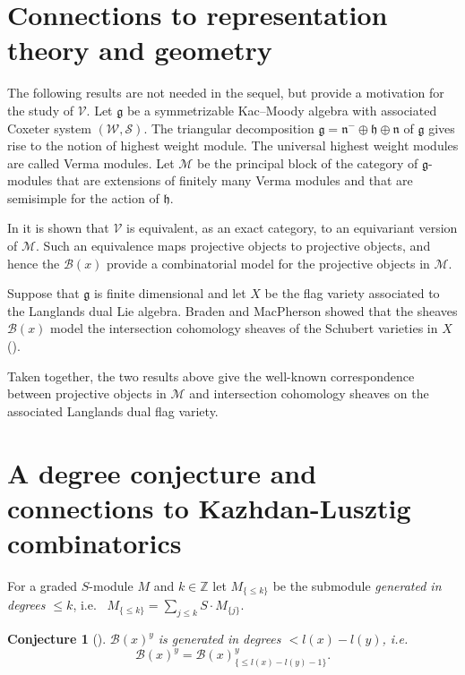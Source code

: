 \documentclass[12pt]{amsart}
\newtheorem{conjecture}[theorem]{Conjecture}
\theoremstyle{definition}
\theoremstyle{remark}
\def\varle{\leqslant}
\newcommand{\CM}{{\mathcal M}}
\newcommand{\CS}{{\mathcal S}}
\newcommand{\CV}{{\mathcal V}}
\newcommand{\CW}{{\mathcal W}}
\newcommand{\fh}{{{\mathfrak h}}}
\newcommand{\fg}{{{\mathfrak g}}}
\newcommand{\fn}{{{\mathfrak n}}}
\newcommand{\SB}{{\mathscr B}}
\newcommand{\DZ}{{\mathbb Z}}
\begin{document}
\section{Connections to representation theory and geometry}
The following results are not needed in the sequel, but provide a motivation for the study of $\CV$. Let $\fg$ be a symmetrizable Kac--Moody algebra with associated Coxeter system $(\CW,\CS)$. The triangular decomposition $\fg=\fn^-\oplus \fh\oplus \fn$ of $\fg$ gives rise to the notion of highest weight module. The universal highest weight modules are called Verma modules. Let $\CM$ be the principal block of the category of $\fg$-modules that are extensions of finitely many Verma modules and that are semisimple for the action of $\fh$.

In \cite{Fie1} it is shown that $\CV$ is equivalent, as an exact category, to an equivariant version of $\CM$. Such an equivalence maps projective objects to projective objects, and hence the $\SB(x)$ provide a combinatorial model for the projective objects in $\CM$.

Suppose that  $\fg$ is finite dimensional and let $X$ be the flag variety associated to the Langlands dual Lie algebra. Braden and MacPherson showed that the sheaves $\SB(x)$ model the intersection cohomology sheaves of the Schubert varieties in $X$ (\cite{BMP}). 

Taken together, the two results above give the well-known correspondence between projective objects in $\CM$ and intersection cohomology sheaves on the associated Langlands dual flag variety. 



\section{A degree conjecture and connections to Kazhdan-Lusztig combinatorics}

 For a graded $S$-module $M$ and $k\in\DZ$ let $M_{\{\varle k\}}$ be the submodule {\em generated in degrees $\leq k$}, i.e.~ $M_{\{\varle k\}}=\sum_{j\leq k} S\cdot M_{\{j\}}$. 

\begin{conjecture}[\cite{Fie2}]\label{dcon} $\SB(x)^y$ is generated in degrees $< l(x)-l(y)$, i.e.~
$$
\SB(x)^y=\SB(x)^{y}_{\{\varle l(x)-l(y)-1\}}.
$$
 \end{conjecture}
\end{document}
